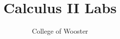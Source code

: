 \documentclass{xourse}
\title{Calculus II Labs}
\author{College of Wooster}
\begin{document}
\maketitle
\begin{abstract}
\end{abstract}
\end{document}
